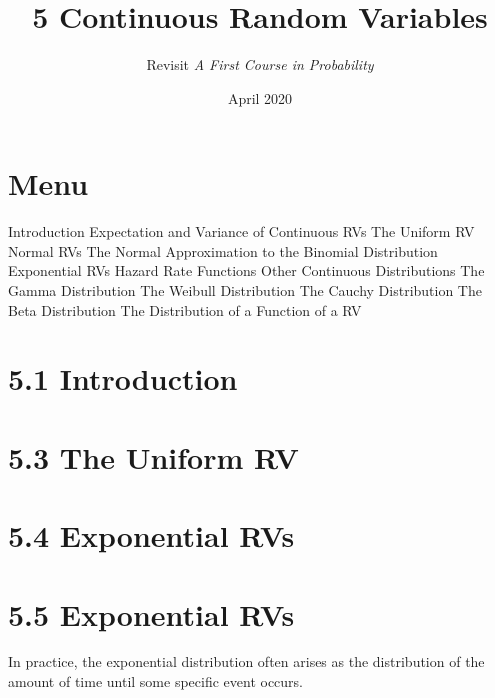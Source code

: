 \documentclass{article}
\title{5 Continuous Random Variables}
\author{Revisit \emph{A First Course in Probability}}
\date{April 2020}
\begin{document}
\maketitle

\section*{Menu}
\begin{outline}[enumerate]
    \1  Introduction
    \1  Expectation and Variance of Continuous RVs 
    \1  The Uniform RV
    \1  Normal RVs
        \2 The Normal Approximation to the Binomial Distribution
    \1  Exponential RVs
        \2 Hazard Rate Functions
    \1  Other Continuous Distributions
        \2 The Gamma Distribution
        \2 The Weibull Distribution
        \2 The Cauchy Distribution
        \2 The Beta Distribution
    \1  The Distribution of a Function of a RV
\end{outline}


\section*{5.1 Introduction}
\section*{5.3 The Uniform RV}
\section*{5.4 Exponential RVs}
\section*{5.5 Exponential RVs}
In practice, the exponential distribution often arises as the distribution of the amount of time until some specific event occurs.



\end{document}
